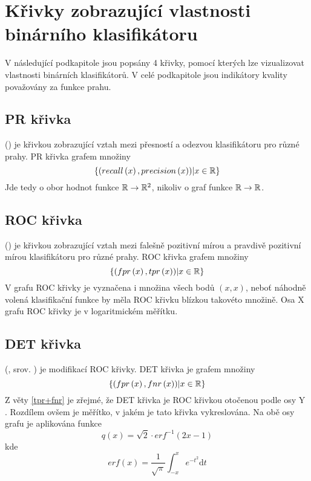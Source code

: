 \section{Křivky zobrazující vlastnosti binárního klasifikátoru}\label{evaluation_curves}
V následující podkapitole jsou popsány 4 křivky, pomocí kterých lze vizualizovat vlastnosti binárních klasifikátorů. V celé podkapitole jsou indikátory kvality považovány za funkce prahu.

\subsection{PR křivka}
 () je křivkou zobrazující vztah mezi přesností a odezvou klasifikátoru pro různé prahy. PR křivka grafem množiny
\[ \left\{ \left( recall \left( x \right), precision \left( x \right) \right) \middle| x \in \mathbb R \right\} \]
Jde tedy o obor hodnot funkce \( \mathbb R \to \mathbb R^2 \), nikoliv o graf funkce \( \mathbb R \to \mathbb R \).

\subsection{ROC křivka}
 () je křivkou zobrazující vztah mezi falešně pozitivní mírou a pravdivě pozitivní mírou klasifikátoru pro různé prahy. ROC křivka grafem množiny
\[ \left\{ \left( fpr \left( x \right), tpr \left( x \right) \right) \middle| x \in \mathbb R \right\} \]
V grafu ROC křivky je vyznačena i množina všech bodů \( \left( x, x \right) \), neboť náhodně volená klasifikační funkce by měla ROC křivku blízkou takovéto množině. Osa X grafu ROC křivky je v logaritmickém měřítku.

\subsection{DET křivka}
 (, srov. \cite{martin_det_1997}) je modifikací ROC křivky. DET křivka je grafem množiny
\[ \left\{ \left( fpr \left( x \right), fnr \left( x \right) \right) \middle| x \in \mathbb R \right\} \]
Z věty \ref{tpr+fnr} je zřejmé, že DET křivka je ROC křivkou otočenou podle osy Y . Rozdílem ovšem je měřítko, v jakém je tato křivka vykreslována. Na obě osy grafu je aplikována funkce
\[ q \left( x \right) = \sqrt{2} \cdot erf^{-1} \left( 2x - 1 \right) \]
kde
\[ erf \left( x \right) = \frac{1}{\sqrt{\pi}} \int_{-x}^{x} e^{-t^2} \mathrm{d} t \]

